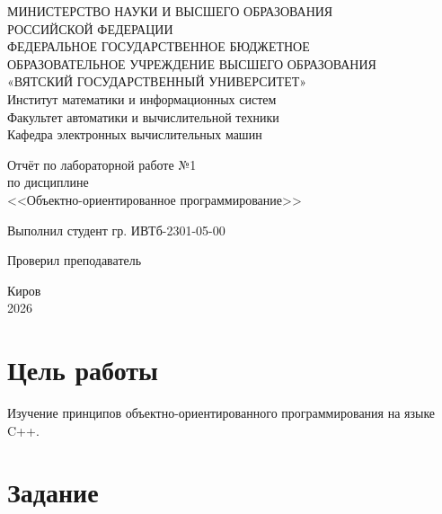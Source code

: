 \documentclass[oneside,a4paper,14pt]{extarticle}
\begin{document}
\newpage\thispagestyle{empty}
\begin{center}
	МИНИСТЕРСТВО НАУКИ И ВЫСШЕГО ОБРАЗОВАНИЯ\\
	РОССИЙСКОЙ ФЕДЕРАЦИИ\\
	ФЕДЕРАЛЬНОЕ ГОСУДАРСТВЕННОЕ БЮДЖЕТНОЕ\\
	ОБРАЗОВАТЕЛЬНОЕ УЧРЕЖДЕНИЕ ВЫСШЕГО ОБРАЗОВАНИЯ\\
	«ВЯТСКИЙ ГОСУДАРСТВЕННЫЙ УНИВЕРСИТЕТ»\\
	Институт математики и информационных систем\\
	Факультет автоматики и вычислительной техники\\
	Кафедра электронных вычислительных машин
\end{center}

\vspace{20mm}
\begin{center}

	Отчёт по лабораторной работе №1\\
	по дисциплине\\
	<<Объектно-ориентированное программирование>>\\
\end{center}
\vfill

Выполнил студент гр. ИВТб-2301-05-00 \hfill
{}

Проверил преподаватель\hfill
{}

\vfill
\begin{center}
	Киров\\
	2026
\end{center}

\newpage
\setcounter{page}{1}
\tableofcontents
\newpage

\section*{Цель работы}
Изучение принципов объектно-ориентированного программирования на языке C++.

\section*{Задание}
\end{document}

